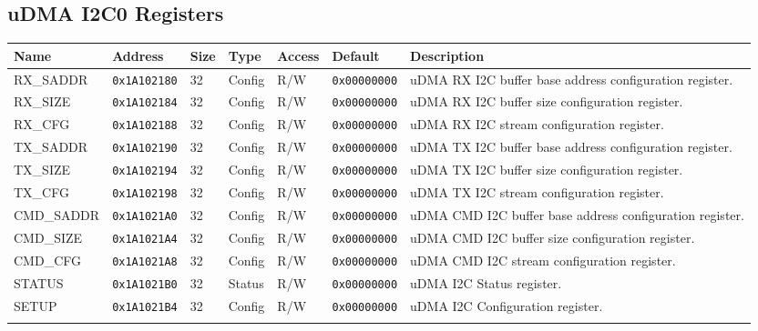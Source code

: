 
\subsection{uDMA I2C0 Registers}
{\small
\begin{tabularx}{\textwidth}{|l|l|l|l|l|l|X|}
  \hline
  \textbf{Name} & \textbf{Address}  & \textbf{Size} & \textbf{Type} & \textbf{Access} & \textbf{Default} & \textbf{Description} \\
  \hline
  RX\_SADDR & \texttt{0x1A102180} & 32 & Config & R/W & \texttt{0x00000000} & uDMA RX I2C buffer base address configuration register.\\
  \hline
  RX\_SIZE & \texttt{0x1A102184} & 32 & Config & R/W & \texttt{0x00000000} & uDMA RX I2C buffer size configuration register.\\
  \hline
  RX\_CFG & \texttt{0x1A102188} & 32 & Config & R/W & \texttt{0x00000000} & uDMA RX I2C stream configuration register.\\
  \hline
  TX\_SADDR & \texttt{0x1A102190} & 32 & Config & R/W & \texttt{0x00000000} & uDMA TX I2C buffer base address configuration register.\\
  \hline
  TX\_SIZE & \texttt{0x1A102194} & 32 & Config & R/W & \texttt{0x00000000} & uDMA TX I2C buffer size configuration register.\\
  \hline
  TX\_CFG & \texttt{0x1A102198} & 32 & Config & R/W & \texttt{0x00000000} & uDMA TX I2C stream configuration register.\\
  \hline
  CMD\_SADDR & \texttt{0x1A1021A0} & 32 & Config & R/W & \texttt{0x00000000} & uDMA CMD I2C buffer base address configuration register.\\
  \hline
  CMD\_SIZE & \texttt{0x1A1021A4} & 32 & Config & R/W & \texttt{0x00000000} & uDMA CMD I2C buffer size configuration register.\\
  \hline
  CMD\_CFG & \texttt{0x1A1021A8} & 32 & Config & R/W & \texttt{0x00000000} & uDMA CMD I2C stream configuration register.\\
  \hline
  STATUS & \texttt{0x1A1021B0} & 32 & Status & R/W & \texttt{0x00000000} & uDMA I2C Status register.\\
  \hline
  SETUP & \texttt{0x1A1021B4} & 32 & Config & R/W & \texttt{0x00000000} & uDMA I2C Configuration register.\\
  \hline
  \caption{uDMA I2C0}
\end{tabularx}
}




